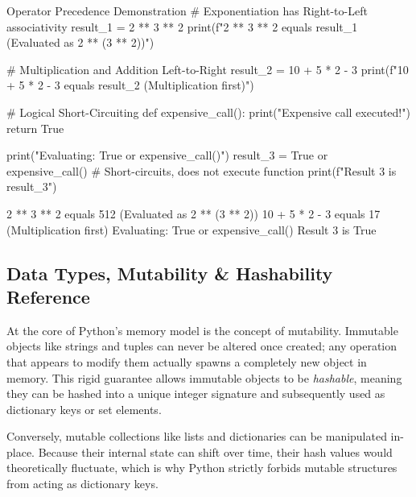 \begin{pythoncode}[]{Operator Precedence Demonstration}
# Exponentiation has Right-to-Left associativity
result_1 = 2 ** 3 ** 2
print(f"2 ** 3 ** 2 equals {result_1} (Evaluated as 2 ** (3 ** 2))")

# Multiplication and Addition Left-to-Right
result_2 = 10 + 5 * 2 - 3
print(f"10 + 5 * 2 - 3 equals {result_2} (Multiplication first)")

# Logical Short-Circuiting
def expensive_call():
    print("Expensive call executed!")
    return True

print("Evaluating: True or expensive_call()")
result_3 = True or expensive_call() # Short-circuits, does not execute function
print(f"Result 3 is {result_3}")
\end{pythoncode}
\begin{outputbox}
2 ** 3 ** 2 equals 512 (Evaluated as 2 ** (3 ** 2))
10 + 5 * 2 - 3 equals 17 (Multiplication first)
Evaluating: True or expensive_call()
Result 3 is True
\end{outputbox}

\subsection{Data Types, Mutability \& Hashability Reference}

At the core of Python's memory model is the concept of mutability. Immutable objects like strings and tuples can never be altered once created; any operation that appears to modify them actually spawns a completely new object in memory. This rigid guarantee allows immutable objects to be \textit{hashable}, meaning they can be hashed into a unique integer signature and subsequently used as dictionary keys or set elements.

Conversely, mutable collections like lists and dictionaries can be manipulated in-place. Because their internal state can shift over time, their hash values would theoretically fluctuate, which is why Python strictly forbids mutable structures from acting as dictionary keys.

